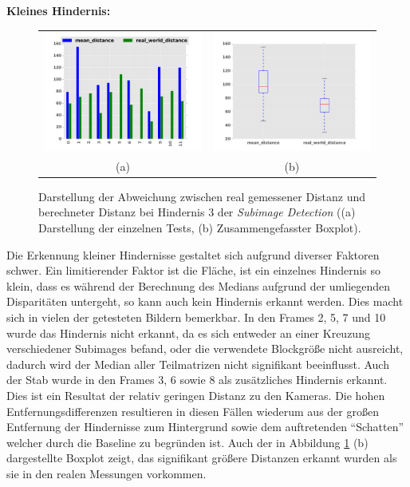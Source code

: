\noindent
\textbf{Kleines Hindernis:}\\
\begin{figure}[h]
	\centering
	\begin{tabular}{cc}
	\includegraphics[width=7cm]{img/evaluation/diagrams/sub_tiny_bar}&
	\includegraphics[width=7cm]{img/evaluation/diagrams/sub_tiny_box}\\
	(a)	& (b)
	\end{tabular}
	\caption{Darstellung der Abweichung zwischen real gemessener Distanz und berechneter Distanz bei Hindernis 3 der \emph{Subimage Detection} ((a) Darstellung der einzelnen Tests, (b) Zusammengefasster Boxplot).}
    \label{fig:eval_tiny}
\end{figure}

\noindent
Die Erkennung kleiner Hindernisse gestaltet sich aufgrund diverser Faktoren schwer. Ein limitierender Faktor ist die Fläche, ist ein einzelnes Hindernis so klein, dass es während der Berechnung des Medians aufgrund der umliegenden Disparitäten untergeht, so kann auch kein Hindernis erkannt werden. Dies macht sich in vielen der getesteten Bildern bemerkbar. In den Frames 2, 5, 7 und 10 wurde das Hindernis nicht erkannt, da es sich entweder an einer Kreuzung verschiedener Subimages befand, oder die verwendete Blockgröße nicht ausreicht, dadurch wird der Median aller Teilmatrizen nicht signifikant beeinflusst. Auch der Stab wurde in den Frames 3, 6 sowie 8 als zusätzliches Hindernis erkannt. Dies ist ein Resultat der relativ geringen Distanz zu den Kameras. Die hohen Entfernungsdifferenzen resultieren in diesen Fällen wiederum aus der großen Entfernung der Hindernisse zum Hintergrund sowie dem auftretenden \enquote{Schatten} welcher durch die Baseline zu begründen ist. Auch der in Abbildung \ref{fig:eval_tiny} (b) dargestellte Boxplot zeigt, das signifikant größere Distanzen erkannt wurden als sie in den realen Messungen vorkommen.

